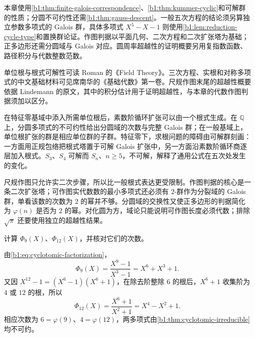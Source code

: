 \ProseParagraphBreak

本章使用\cref{b1:thm:finite-galois-correspondence}、\cref{b1:thm:kummer-cyclic}和可解群的性质；分圆不可约性还需\cref{b1:thm:gauss-descent}。一般五次方程的结论须另算独立参数多项式的 Galois 群，具体多项式 \(X^5-X-1\) 则使用\cref{b1:lem:reduction-cycle-type}和置换群论证。作图判据以平面几何、二次方程和二次扩张塔为基础；正多边形还需分圆域与 Galois 对应。圆周率超越性的证明概要另用复指数函数、路径积分与代数整数范数。

\ProseParagraphBreak
单位根与根式可解性可读 Roman 的《Field Theory》\cite[Sections 11.1--11.2, 13.2--13.7]{Roman2006FieldTheory}。三次方程、实根和对称多项式的中文基础材料可见席南华的《基础代数》第一卷\cite[第7章]{Xi2016BasicAlgebraI}。尺规作图末尾的超越性概要依据 Lindemann 的原文\cite[\S\S 1--4, pp. 214--225]{Lindemann1882Pi}，其中的积分估计用于证明超越性，与本章的代数作图判据须加以区分。






\begin{chaptersummary}
	在特征零基域中添入所需单位根后，素数阶循环扩张可以由一个根式生成。在 \(\mathbb Q\) 上，分圆多项式的不可约性给出分圆域的次数与完整 Galois 群；在一般基域上，单位根扩张的群是相应单位群的子群。特征零下，求根问题的障碍由可解群刻画：一方面用正规包络把根式塔置于可解 Galois 扩张中，另一方面沿素数阶循环商逐层加入根式。\(S_3\)、\(S_4\) 可解而 \(S_n\)、\(n\geq5\)，不可解，解释了通用公式在五次处发生的变化。

	\ProseParagraphBreak
	尺规作图只允许实二次步骤，所以比一般根式表达更受限制。作图判据的核心是一条二次扩张塔；可作图实代数数的最小多项式还必须有 \(2\)-群作为分裂域的 Galois 群，单看该数的次数为 \(2\) 的幂并不够。分圆域的交换性又使正多边形的判据简化为 \(\varphi(n)\) 是否为 \(2\) 的幂。对化圆为方，域论只能说明可作图长度必须代数；排除 \(\sqrt\pi\) 还要使用独立的超越性结果。
\end{chaptersummary}

\BookExercises

\begin{exercise}\label{b1:ex:21-1}
	计算 \(\Phi_9(X)\)、\(\Phi_{12}(X)\)，并核对它们的次数。
\end{exercise}
\begin{solution}
	由\eqref{b1:eq:cyclotomic-factorization}，
	\[
		\Phi_9(X)=\frac{X^9-1}{X^3-1}=X^6+X^3+1.
	\]
	又因 \(X^{12}-1=(X^6-1)(X^6+1)\)，在除去阶整除 \(6\) 的根后，\(X^6+1\) 收集阶为 \(4\) 或 \(12\) 的根，所以
	\[
		\Phi_{12}(X)=\frac{X^6+1}{X^2+1}=X^4-X^2+1.
	\]
	相应次数为 \(6=\varphi(9)\)、\(4=\varphi(12)\)，两多项式由\cref{b1:thm:cyclotomic-irreducible}均不可约。
\end{solution}

